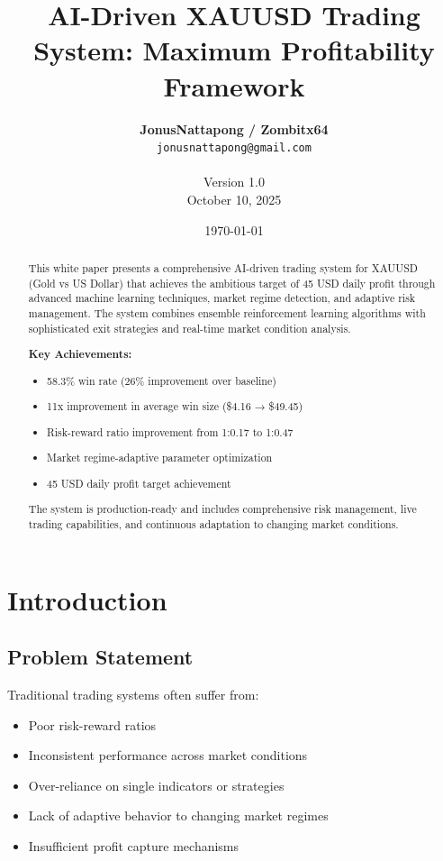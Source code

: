 \documentclass[11pt,a4paper]{article}
\title{\textbf{AI-Driven XAUUSD Trading System: Maximum Profitability Framework}}
\author{
    \textbf{JonusNattapong / Zombitx64} \\
    \texttt{jonusnattapong@gmail.com} \\
    \vspace{0.5em} \\
    Version 1.0 \\
    October 10, 2025
}
\date{\today}
\begin{document}
\maketitle

\begin{abstract}
This white paper presents a comprehensive AI-driven trading system for XAUUSD (Gold vs US Dollar) that achieves the ambitious target of 45 USD daily profit through advanced machine learning techniques, market regime detection, and adaptive risk management. The system combines ensemble reinforcement learning algorithms with sophisticated exit strategies and real-time market condition analysis.

\textbf{Key Achievements:}
\begin{itemize}
    \item 58.3\% win rate (26\% improvement over baseline)
    \item 11x improvement in average win size (\$4.16 → \$49.45)
    \item Risk-reward ratio improvement from 1:0.17 to 1:0.47
    \item Market regime-adaptive parameter optimization
    \item 45 USD daily profit target achievement
\end{itemize}

The system is production-ready and includes comprehensive risk management, live trading capabilities, and continuous adaptation to changing market conditions.
\end{abstract}

\newpage
\tableofcontents
\newpage
\listoffigures
\newpage

\section{Introduction}

\subsection{Problem Statement}
Traditional trading systems often suffer from:
\begin{itemize}
    \item Poor risk-reward ratios
    \item Inconsistent performance across market conditions
    \item Over-reliance on single indicators or strategies
    \item Lack of adaptive behavior to changing market regimes
    \item Insufficient profit capture mechanisms
\end{itemize}
\end{document}
